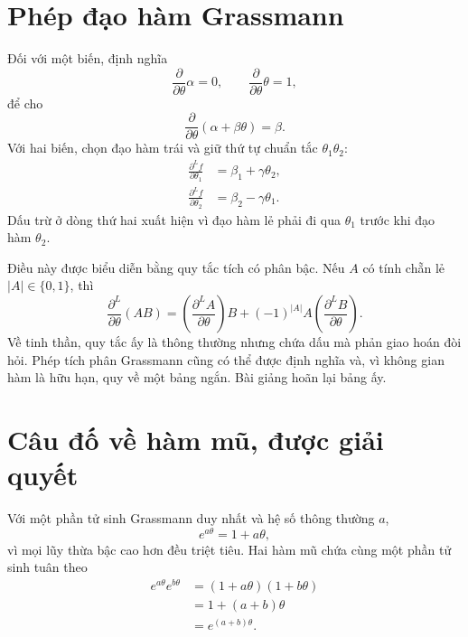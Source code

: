 \section{Phép đạo hàm Grassmann}

Đối với một biến, định nghĩa
\begin{equation}
\frac{\partial}{\partial\theta}\alpha=0,
\qquad
\frac{\partial}{\partial\theta}\theta=1,
\end{equation}
để cho
\begin{equation}
\frac{\partial}{\partial\theta}
(\alpha+\beta\theta)=\beta.
\end{equation}
Với hai biến, chọn đạo hàm trái và giữ thứ tự chuẩn tắc \(\theta_1\theta_2\):
\begin{align}
\frac{\partial^L f}{\partial\theta_1}
&=\beta_1+\gamma\theta_2,\\
\frac{\partial^L f}{\partial\theta_2}
&=\beta_2-\gamma\theta_1.
\end{align}
Dấu trừ ở dòng thứ hai xuất hiện vì đạo hàm lẻ phải đi qua \(\theta_1\) trước khi đạo hàm \(\theta_2\).

Điều này được biểu diễn bằng quy tắc tích có phân bậc. Nếu \(A\) có tính chẵn lẻ \(|A|\in\{0,1\}\), thì
\begin{equation}
\frac{\partial^L}{\partial\theta}(AB)
=\left(\frac{\partial^L A}{\partial\theta}\right)B
+(-1)^{|A|}A
\left(\frac{\partial^L B}{\partial\theta}\right).
\end{equation}
Về tinh thần, quy tắc ấy là thông thường nhưng chứa dấu mà phản giao hoán đòi hỏi. Phép tích phân Grassmann cũng có thể được định nghĩa và, vì không gian hàm là hữu hạn, quy về một bảng ngắn. Bài giảng hoãn lại bảng ấy.

\section{Câu đố về hàm mũ, được giải quyết}

Với một phần tử sinh Grassmann duy nhất và hệ số thông thường \(a\),
\begin{equation}
e^{a\theta}
=1+a\theta,
\end{equation}
vì mọi lũy thừa bậc cao hơn đều triệt tiêu. Hai hàm mũ chứa cùng một phần tử sinh tuân theo
\begin{align}
e^{a\theta}e^{b\theta}
&=(1+a\theta)(1+b\theta)\\
&=1+(a+b)\theta\\
&=e^{(a+b)\theta}.
\end{align}

